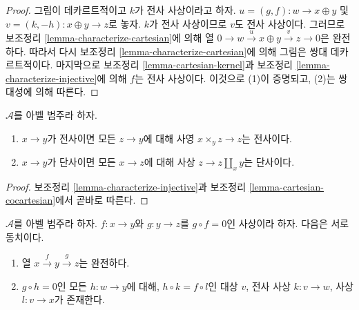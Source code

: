 \begin{proof}
그림이 데카르트적이고 $k$가 전사 사상이라고 하자.
$u = (g, f) : w \to x \oplus y$ 및
$v = (k, -h) : x \oplus y \to z$로 놓자. $k$가 전사 사상이므로
$v$도 전사 사상이다. 그러므로 보조정리 \ref{lemma-characterize-cartesian}에
의해 열 $0\to w\overset{u}\to x\oplus y\overset{v}\to z\to 0$은
완전하다. 따라서 다시 보조정리 \ref{lemma-characterize-cartesian}에 의해
그림은 쌍대 데카르트적이다. 마지막으로 보조정리
\ref{lemma-cartesian-kernel}과 보조정리
\ref{lemma-characterize-injective}에 의해 $f$는 전사 사상이다.
이것으로 (1)이 증명되고, (2)는 쌍대성에 의해 따른다.
\end{proof}

\begin{lemma}
\label{lemma-epimorphism-universal-abelian-category}
$\mathcal{A}$를 아벨 범주라 하자.
\begin{enumerate}
\item $x \to y$가 전사이면 모든 $z \to y$에 대해 사영
$x \times_y z \to z$는 전사이다.
\item $x \to y$가 단사이면 모든 $x \to z$에 대해 사상
$z \to z \amalg_x y$는 단사이다.
\end{enumerate}
\end{lemma}

\begin{proof}
보조정리 \ref{lemma-characterize-injective}과 보조정리
\ref{lemma-cartesian-cocartesian}에서 곧바로 따른다.
\end{proof}

\begin{lemma}
\label{lemma-check-exactness-fibre-product}
$\mathcal{A}$를 아벨 범주라 하자. $f:x\to y$와 $g:y\to z$를
$g\circ f=0$인 사상이라 하자. 다음은 서로 동치이다.
\begin{enumerate}
\item 열 $x\overset{f}\to y\overset{g}\to z$는 완전하다.
\item $g\circ h=0$인 모든 $h:w\to y$에 대해, $h\circ k=f\circ l$인
대상 $v$, 전사 사상 $k:v\to w$, 사상 $l:v\to x$가 존재한다.
\end{enumerate}
\end{lemma}

